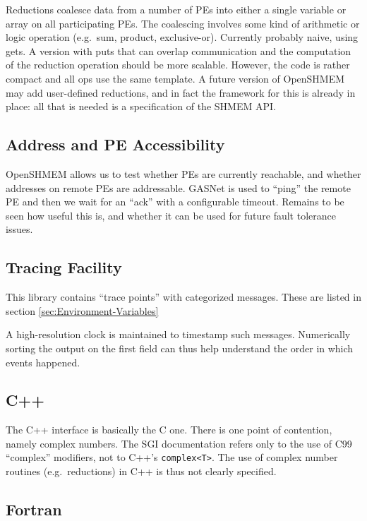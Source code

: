 \documentclass[english]{article}
\begin{document}
Reductions coalesce data from a number of PEs into either a single
variable or array on all participating PEs. The coalescing involves
some kind of arithmetic or logic operation (e.g.\ sum, product,
exclusive-or).  Currently probably naive, using gets. A version with
puts that can overlap communication and the computation of the
reduction operation should be more scalable. However, the code is
rather compact and all ops use the same template. A future version of
OpenSHMEM may add user-defined reductions, and in fact the framework
for this is already in place: all that is needed is a specification of
the SHMEM API.

\subsection{Address and PE Accessibility}

OpenSHMEM allows us to test whether PEs are currently reachable, and
whether addresses on remote PEs are addressable. GASNet is used to
``ping'' the remote PE and then we wait for an ``ack'' with a
configurable timeout. Remains to be seen how useful this is, and
whether it can be used for future fault tolerance issues.

\subsection{Tracing Facility}

This library contains \textquotedblleft{}trace
points\textquotedblright{} with categorized messages. These are listed
in section \ref{sec:Environment-Variables}

A high-resolution clock is maintained to timestamp such messages.
Numerically sorting the output on the first field can thus help
understand the order in which events happened.

\subsection{C++}

The C++ interface is basically the C one. There is one point of
contention, namely complex numbers. The SGI documentation refers only
to the use of C99 ``complex'' modifiers, not to C++'s
\texttt{complex<T>}.  The use of complex number routines (e.g.\
reductions) in C++ is thus not clearly specified.

\subsection{Fortran}
\end{document}
